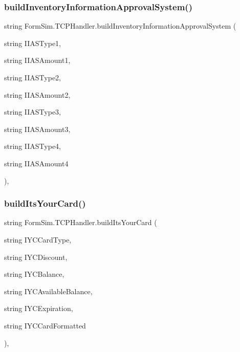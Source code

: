 \subsubsection{\texorpdfstring{build\+Inventory\+Information\+Approval\+System()}{buildInventoryInformationApprovalSystem()}}
{\footnotesize\ttfamily string Form\+Sim.\+T\+C\+P\+Handler.\+build\+Inventory\+Information\+Approval\+System (\begin{DoxyParamCaption}\item[{string}]{I\+I\+A\+S\+Type1,  }\item[{string}]{I\+I\+A\+S\+Amount1,  }\item[{string}]{I\+I\+A\+S\+Type2,  }\item[{string}]{I\+I\+A\+S\+Amount2,  }\item[{string}]{I\+I\+A\+S\+Type3,  }\item[{string}]{I\+I\+A\+S\+Amount3,  }\item[{string}]{I\+I\+A\+S\+Type4,  }\item[{string}]{I\+I\+A\+S\+Amount4 }\end{DoxyParamCaption})\hspace{0.3cm}{\ttfamily [inline]}, {\ttfamily [private]}}

\mbox{\label{class_form_sim_1_1_t_c_p_handler_aaf84b1a98216bbe1e593574e31282e96}} 
\subsubsection{\texorpdfstring{build\+Its\+Your\+Card()}{buildItsYourCard()}}
{\footnotesize\ttfamily string Form\+Sim.\+T\+C\+P\+Handler.\+build\+Its\+Your\+Card (\begin{DoxyParamCaption}\item[{string}]{I\+Y\+C\+Card\+Type,  }\item[{string}]{I\+Y\+C\+Discount,  }\item[{string}]{I\+Y\+C\+Balance,  }\item[{string}]{I\+Y\+C\+Available\+Balance,  }\item[{string}]{I\+Y\+C\+Expiration,  }\item[{string}]{I\+Y\+C\+Card\+Formatted }\end{DoxyParamCaption})\hspace{0.3cm}{\ttfamily [inline]}, {\ttfamily [private]}}


